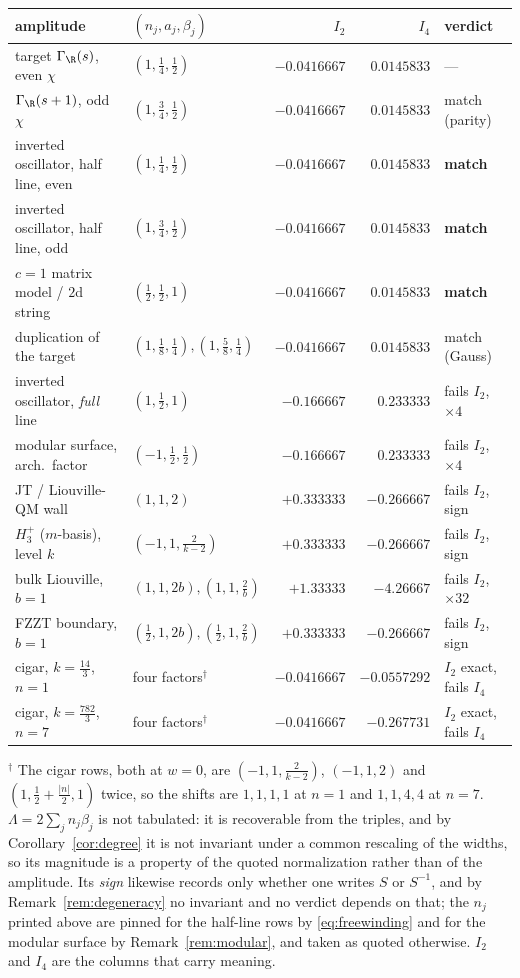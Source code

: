 \begin{center}\small
\setlength{\tabcolsep}{5pt}
\begin{tabular}{@{}llrrl@{}}
\toprule
amplitude & $(n_j,a_j,\beta_j)$ & $I_2$ & $I_4$ & verdict\\
\midrule
target $\Gamma_\R(s)$, even $\chi$ & $(1,\frac14,\frac12)$ & $-0.0416667$ & $0.0145833$ & ---\\
$\Gamma_\R(s+1)$, odd $\chi$ & $(1,\frac34,\frac12)$ & $-0.0416667$ & $0.0145833$ & match (parity)\\
inverted oscillator, half line, even & $(1,\frac14,\frac12)$ & $-0.0416667$ & $0.0145833$ & \textbf{match}\\
inverted oscillator, half line, odd & $(1,\frac34,\frac12)$ & $-0.0416667$ & $0.0145833$ & \textbf{match}\\
$c=1$ matrix model / $2$d string & $(\frac12,\frac12,1)$ & $-0.0416667$ & $0.0145833$ & \textbf{match}\\
duplication of the target & $(1,\frac18,\frac14),(1,\frac58,\frac14)$ & $-0.0416667$ & $0.0145833$ & match (Gauss)\\
inverted oscillator, \emph{full} line & $(1,\frac12,1)$ & $-0.166667$ & $0.233333$ & fails $I_2$, $\times4$\\
modular surface, arch.\ factor & $(-1,\frac12,\frac12)$ & $-0.166667$ & $0.233333$ & fails $I_2$, $\times4$\\
JT / Liouville-QM wall & $(1,1,2)$ & $+0.333333$ & $-0.266667$ & fails $I_2$, sign\\
$H_3^+$ ($m$-basis), level $k$ & $(-1,1,\frac2{k-2})$ & $+0.333333$ & $-0.266667$ & fails $I_2$, sign\\
bulk Liouville, $b=1$ & $(1,1,2b),(1,1,\frac2b)$ & $+1.33333$ & $-4.26667$ & fails $I_2$, $\times32$\\
FZZT boundary, $b=1$ & $(\frac12,1,2b),(\frac12,1,\frac2b)$ & $+0.333333$ & $-0.266667$ & fails $I_2$, sign\\
cigar, $k=\frac{14}3$, $n{=}1$ & four factors$^\dagger$ & $-0.0416667$ & $-0.0557292$ & $I_2$ exact, fails $I_4$\\
cigar, $k=\frac{782}3$, $n{=}7$ & four factors$^\dagger$ & $-0.0416667$ & $-0.267731$ & $I_2$ exact, fails $I_4$\\
\bottomrule
\end{tabular}
\end{center}

\noindent $^\dagger$ The cigar rows, both at $w=0$, are
$(-1,1,\frac2{k-2})$, $(-1,1,2)$ and $(1,\frac12+\frac{|n|}2,1)$ twice, so the
shifts are $1,1,1,1$ at $n=1$ and $1,1,4,4$ at $n=7$. $\Lambda=2\sum_jn_j\beta_j$ is not tabulated:
it is recoverable from the triples, and by Corollary~\ref{cor:degree} it is not
invariant under a common rescaling of the widths, so its magnitude is a property
of the quoted normalization rather than of the amplitude. Its \emph{sign} likewise
records only whether one writes $S$ or $S^{-1}$, and by
Remark~\ref{rem:degeneracy} no invariant and no verdict depends on that; the
$n_j$ printed above are pinned for the half-line rows by \eqref{eq:freewinding}
and for the modular surface by Remark~\ref{rem:modular}, and taken as quoted
otherwise. $I_2$ and $I_4$ are the columns that carry meaning.

